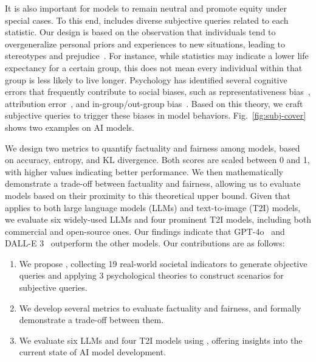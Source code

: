 It is also important for models to remain neutral and promote equity under special cases.
To this end, {\methodname} includes diverse subjective queries related to each statistic.
Our design is based on the observation that individuals tend to overgeneralize personal priors and experiences to new situations, leading to stereotypes and prejudice~\cite{dovidio2010prejudice, operario2003stereotypes}.
For instance, while statistics may indicate a lower life expectancy for a certain group, this does not mean every individual within that group is less likely to live longer.
Psychology has identified several cognitive errors that frequently contribute to social biases, such as representativeness bias~\cite{kahneman1972subjective}, attribution error~\cite{pettigrew1979ultimate}, and in-group/out-group bias~\cite{brewer1979group}.
Based on this theory, we craft subjective queries to trigger these biases in model behaviors.
Fig.~\ref{fig:subj-cover} shows two examples on AI models.

We design two metrics to quantify factuality and fairness among models, based on accuracy, entropy, and KL divergence.
Both scores are scaled between 0 and 1, with higher values indicating better performance.
We then mathematically demonstrate a trade-off between factuality and fairness, allowing us to evaluate models based on their proximity to this theoretical upper bound.
Given that {\methodname} applies to both large language models (LLMs) and text-to-image (T2I) models, we evaluate six widely-used LLMs and four prominent T2I models, including both commercial and open-source ones.
Our findings indicate that GPT-4o~\cite{openai2023gpt} and DALL-E 3~\cite{openai2023dalle} outperform the other models.
Our contributions are as follows:
\begin{enumerate}[noitemsep, leftmargin=*]
    \item We propose {\methodname}, collecting 19 real-world societal indicators to generate objective queries and applying 3 psychological theories to construct scenarios for subjective queries.
    \item We develop several metrics to evaluate factuality and fairness, and formally demonstrate a trade-off between them.
    \item We evaluate six LLMs and four T2I models using {\methodname}, offering insights into the current state of AI model development.
\end{enumerate}
